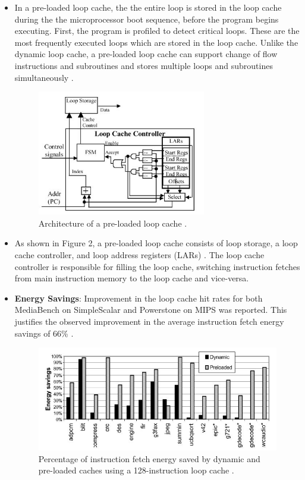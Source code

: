 \documentclass[conference]{IEEEtran}
\begin{document}
\begin{itemize}
    \item In a pre-loaded loop cache, the the entire loop is stored in the loop cache
during the  the microprocessor boot sequence, before the program begins executing. First, the program is profiled to detect critical loops. These are the most frequently executed loops which are stored in the loop cache. Unlike the dynamic loop cache, a pre-loaded loop cache can support change of flow instructions and subroutines and stores multiple loops and subroutines simultaneously \cite{1}.
 \begin{figure}[!h]
	\centering
	\includegraphics[width=2.9in]{images/fig4.JPG}
	\caption{Architecture of a pre-loaded loop cache \cite{1}.}
	\label{}
\end{figure}
\item As shown in Figure 2, a pre-loaded loop cache consists of loop storage, a loop cache controller, and loop address registers (LARs) \cite{1}. The loop cache controller is responsible for filling the loop cache, switching instruction fetches from main instruction memory to the loop cache and vice-versa.
    \item \textbf{Energy Savings}: Improvement in the loop cache hit rates for both MediaBench on SimpleScalar and Powerstone on MIPS was reported. This justifies the observed improvement in the average instruction fetch energy savings of 66\% \cite{1}.
    \begin{figure}[!h]
	\centering
	\includegraphics[width=3.5 in]{images/fig7.JPG}
	\caption{Percentage of instruction fetch energy saved by dynamic and pre-loaded caches using a 128-instruction loop cache \cite{1}.}
	\label{}
\end{figure}
\end{itemize}
\end{document}
